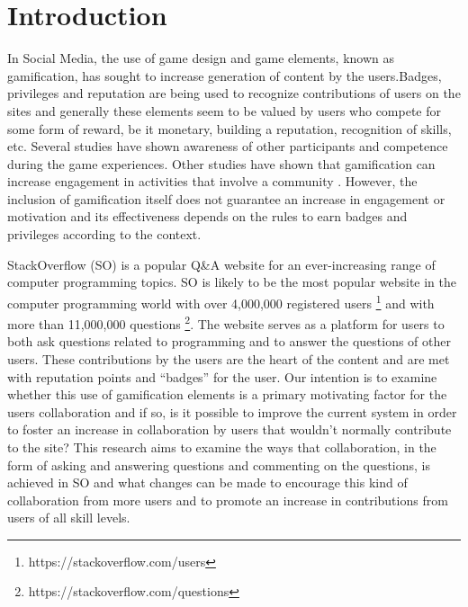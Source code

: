\documentclass{sigchi}
\begin{document}

 

\section{Introduction}
In Social Media, the use of game design and game elements, known as gamification, has sought to increase generation of content by the users.Badges, privileges and reputation are being used to recognize contributions of users on the sites and generally these elements seem to be valued by users who compete for some form of reward, be it monetary, building a reputation, recognition of skills, etc. Several studies have shown awareness of other participants and competence during the game experiences\cite{Rughinis}. Other studies have shown that gamification can increase engagement in activities that involve a community \cite{Marder}. However, the inclusion of gamification itself does not guarantee an increase in engagement or motivation and its effectiveness depends on the rules to earn badges and privileges  according to the context\cite{Deterding}.


StackOverflow (SO) is a popular Q\&A website for an ever-increasing range of computer programming topics. SO is likely to be the most popular website in the computer programming world with over 4,000,000 registered users \footnote{https://stackoverflow.com/users} and with more than 11,000,000 questions \footnote{https://stackoverflow.com/questions}. The website serves as a platform for users to both ask questions related to programming and to answer the questions of other users. These contributions by the users are the heart of the content and are met with reputation points and “badges” for the user. Our intention is to examine whether this use of gamification elements is a primary motivating factor for the users collaboration and if so, is it possible to improve the current system in order to foster an increase in collaboration by users that wouldn't normally contribute to the site?
This research aims to examine the ways that collaboration, in the form of asking and answering questions and commenting on the questions, is achieved in SO and what changes can be made to encourage this kind of collaboration from more users and to promote an increase in contributions from users of all skill levels.
\end{document}
